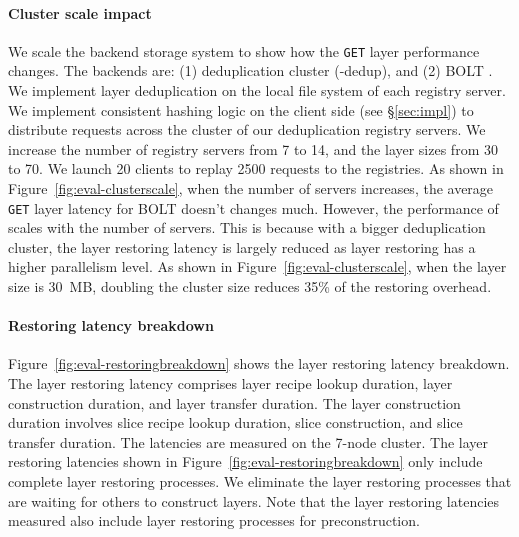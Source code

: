 \paragraph{Cluster scale impact}
We scale the backend storage system to show how the \texttt{GET} layer performance changes. 
The backends are:
 (1) \sysname deduplication cluster (\sysname-dedup),
 and
 (2) BOLT \cite{littley2019bolt}.
 We implement layer deduplication on the
 local file system of each registry server.
We implement consistent hashing logic on the client side (see \S\ref{sec:impl}) to distribute requests across the cluster of our deduplication registry servers.
We increase the number of registry servers from 7 to 14,
and the layer sizes from 30 to 70.
We launch 20 clients to replay 2500 requests  to the registries.
%
As shown in Figure~\ref{fig:eval-clusterscale}, when the number of servers increases, the average \texttt{GET} layer latency for BOLT doesn't changes much.
However, the performance of \sysname scales with the number of servers.
This is because with a bigger deduplication cluster, the layer restoring latency is largely reduced as layer restoring has a higher parallelism level. 
As shown in Figure~\ref{fig:eval-clusterscale}, when the layer size is 30~MB, doubling the cluster size reduces 35\% of the restoring overhead.

\paragraph{Restoring latency breakdown}

Figure~\ref{fig:eval-restoringbreakdown} shows 
the layer restoring latency breakdown.
The layer restoring latency comprises layer recipe lookup duration, layer construction duration, and layer transfer duration.
The layer construction duration involves slice recipe lookup duration, slice construction, and slice transfer duration.
%
The latencies are measured on the 7-node cluster.
The layer restoring latencies shown in Figure~\ref{fig:eval-restoringbreakdown} only include complete layer restoring processes. 
We eliminate the layer restoring processes that are waiting for others to construct layers.
Note that the layer restoring latencies measured also include layer restoring processes for preconstruction.

